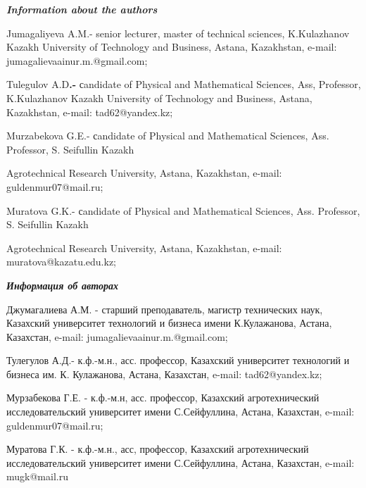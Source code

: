 \emph{{\bfseries Information about the authors}}

\begin{noparindent}
Jumagaliyeva A.M.- senior lecturer, master of technical sciences,
K.Kulazhanov Kazakh University of Technology and Business, Astana,
Kazakhstan, e-mail: jumagalievaainur.m.@gmail.com;

Tulegulov A.D{\bfseries .-} сandidate of Physical and Mathematical
Sciences, Ass, Professor, K.Kulazhanov Kazakh University of Technology
and Business, Astana, Kazakhstan, e-mail: tad62@yandex.kz;

Murzabekova G.E.- сandidate of Physical and Mathematical Sciences, Ass.
Professor, S. Seifullin Kazakh

Agrotechnical Research University,
Astana, Kazakhstan, e-mail: guldenmur07@mail.ru;

Muratova G.K.- сandidate of Physical and Mathematical Sciences, Ass.
Professor, S. Seifullin Kazakh

Agrotechnical Research University,
Astana, Kazakhstan, e-mail: muratova@kazatu.edu.kz;
\end{noparindent}

\emph{{\bfseries Информация об авторах}}

\begin{noparindent}
Джумагалиева А.М. - старший преподаватель, магистр технических наук,
Казахский университет технологий и бизнеса имени К.Кулажанова, Астана,
Казахстан, e-mail: jumagalievaainur.m.@gmail.com;

Тулегулов А.Д.- к.ф.-м.н., асс. профессор, Казахский университет
технологий и бизнеса им. К. Кулажанова, Астана, Казахстан, e-mail:
tad62@yandex.kz;

Мурзабекова Г.Е. - к.ф.-м.н, асс. профессор, Казахский агротехнический
исследовательский университет имени С.Сейфуллина, Астана, Казахстан,
e-mail: guldenmur07@mail.ru;

Муратова Г.К. - к.ф.-м.н., асс, профессор, Казахский агротехнический
исследовательский университет имени С.Сейфуллина, Астана, Казахстан,
e-mail: mugk@mail.ru
\end{noparindent}
